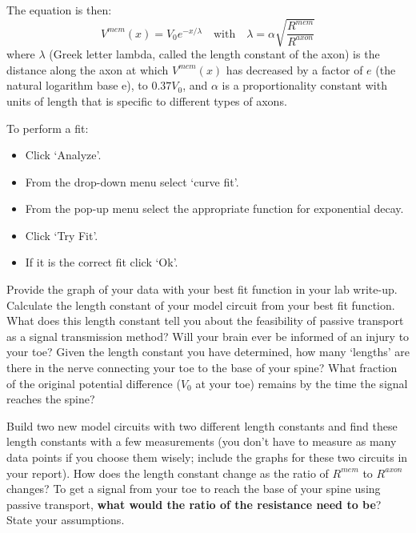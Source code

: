 The equation is then:
\[ V^{mem}(x) = V_{0} e^{-x/\lambda} \quad \textrm{with} \quad \lambda =\alpha \sqrt{\frac{R^{mem}}{R^{axon}}}  \]
where $\lambda$ (Greek letter lambda, called the length constant of the axon) is the distance along the axon at which $V^{mem}(x)$ has decreased by a factor of $e$ (the natural logarithm base e), to $0.37 V_{0}$, and $\alpha$ is a proportionality constant with units of length that is specific to different types of axons.
\par 
To perform a fit:
\begin{itemize}
\itemsep-0.2em
\item Click `Analyze'.
\item From the drop-down menu select `curve fit'.
\item From the pop-up menu select the appropriate function for exponential decay.
\item Click `Try Fit'.
\item If it is the correct fit click `Ok'.
\end{itemize}
Provide the graph of your data with your best fit function in your lab write-up.
Calculate the length constant of your model circuit from your best fit function.
What does this length constant tell you about the feasibility of passive transport as a signal transmission method?
Will your brain ever be informed of an injury to your toe?
Given the length constant you have determined, how many `lengths' are there in the nerve connecting your toe to the base of your spine?
What fraction of the original potential difference ($V_{0}$ at your toe) remains by the time the signal reaches the spine?
\par 
Build two new model circuits with two different length constants and find these length constants with a few measurements (you don't have to measure as many data points if you choose them wisely; include the graphs for these two circuits in your report).
How does the length constant change as the ratio of $R^{mem}$ to $R^{axon}$ changes?
To get a signal from your toe to reach the base of your spine using passive transport, \textbf{what would the ratio of the resistance need to be}?
State your assumptions.

